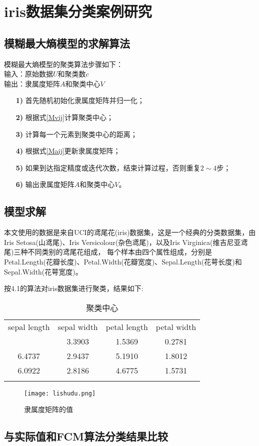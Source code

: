 \chapter{iris数据集分类案例研究}
\section{模糊最大熵模型的求解算法}
模糊最大熵模型的聚类算法步骤如下：\\
输入：原始数据$U$和聚类数$c$\\
输出：隶属度矩阵$A$和聚类中心$V$
\begin{itemize}
    \item[\bf{1)}]首先随机初始化隶属度矩阵并归一化；
    \item[\bf{2)}]根据式\ref{Mvij}计算聚类中心；
    \item[\bf{3)}]计算每一个元素到聚类中心的距离；
    \item[\bf{4)}]根据式\ref{Maij}更新隶属度矩阵；
    \item[\bf{5)}]如果到达指定精度或迭代次数，结束计算过程，否则重复$2\sim 4$步；
    \item[\bf{6)}]输出隶属度矩阵$A$和聚类中心$V$。
\end{itemize}

\section{模型求解}
\par
本文使用的数据是来自UCI的鸢尾花(iris)数据集，这是一个经典的分类数据集，由Iris Setosa(山鸢尾)、Iris Versicolour(杂色鸢尾)，以及Iris Virginica(维吉尼亚鸢尾)三种不同类别的鸢尾花组成，
每个样本由四个属性组成，分别是Petal.Length(花瓣长度)、Petal.Width(花瓣宽度)、Sepal.Length(花萼长度)和Sepal.Width(花萼宽度)。
\par 按4.1的算法对iris数据集进行聚类，结果如下:
\begin{table}[!ht]
    \label{聚类中心}
    \caption{聚类中心}
    \centering
    \begin{tabular}{c c c c}
        \whline sepal length & sepal width & petal length & petal width \\\whline
        5.0136               & 3.3903      & 1.5369       & 0.2781      \\
        6.4737               & 2.9437      & 5.1910       & 1.8012      \\
        6.0922               & 2.8186      & 4.6775       & 1.5731      \\
        \whline
    \end{tabular}
\end{table}
\begin{figure}[ht]
    \centering
    \texttt{[image: lishudu.png]}
    \caption{隶属度矩阵的值}
    \label{隶属度}
\end{figure}
\section{与实际值和FCM算法分类结果比较}